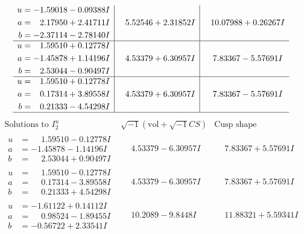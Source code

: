 \documentclass[1p]{elsarticle_modified}
\theoremstyle{definition}
\newcommand{\I}{\sqrt{-1}}
\begin{document}
$$\begin{array}{c|c|c}
\begin{aligned}
u &= -1.59018 - 0.09388 I \\
a &= \phantom{-}2.17950 + 2.41711 I \\
b &= -2.37114 - 2.78140 I\end{aligned}
 & \phantom{-}5.52546 + 2.31852 I & \phantom{-}10.07988 + 0.26267 I \\ \hline\begin{aligned}
u &= \phantom{-}1.59510 + 0.12778 I \\
a &= -1.45878 + 1.14196 I \\
b &= \phantom{-}2.53044 - 0.90497 I\end{aligned}
 & \phantom{-}4.53379 + 6.30957 I & \phantom{-}7.83367 - 5.57691 I \\ \hline\begin{aligned}
u &= \phantom{-}1.59510 + 0.12778 I \\
a &= \phantom{-}0.17314 + 3.89558 I \\
b &= \phantom{-}0.21333 - 4.54298 I\end{aligned}
 & \phantom{-}4.53379 + 6.30957 I & \phantom{-}7.83367 - 5.57691 I\\
 \hline 
 \end{array}$$\newpage$$\begin{array}{c|c|c}  
\text{Solutions to }I^u_{2}& \I (\text{vol} + \sqrt{-1}CS) & \text{Cusp shape}\\
 \hline 
\begin{aligned}
u &= \phantom{-}1.59510 - 0.12778 I \\
a &= -1.45878 - 1.14196 I \\
b &= \phantom{-}2.53044 + 0.90497 I\end{aligned}
 & \phantom{-}4.53379 - 6.30957 I & \phantom{-}7.83367 + 5.57691 I \\ \hline\begin{aligned}
u &= \phantom{-}1.59510 - 0.12778 I \\
a &= \phantom{-}0.17314 - 3.89558 I \\
b &= \phantom{-}0.21333 + 4.54298 I\end{aligned}
 & \phantom{-}4.53379 - 6.30957 I & \phantom{-}7.83367 + 5.57691 I \\ \hline\begin{aligned}
u &= -1.61122 + 0.14112 I \\
a &= \phantom{-}0.98524 - 1.89455 I \\
b &= -0.56722 + 2.33541 I\end{aligned}
 & \phantom{-}10.2089 - 9.8448 I & \phantom{-}11.88321 + 5.59341 I \\ \hline\begin{aligned}

\end{aligned}
\end{array}$$
\end{document}

